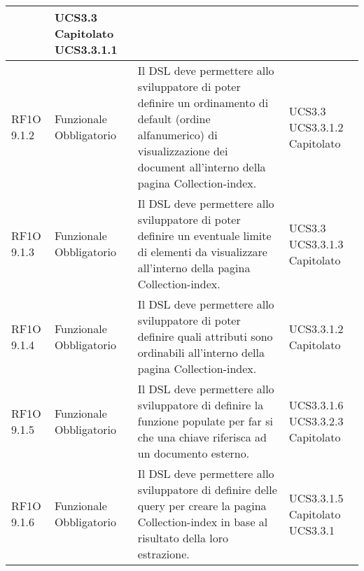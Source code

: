 \begin{center}
\begin{longtable}{ | l | p{2cm} | p{5cm} | p{1.7cm} |}
 &  UCS3.3 \newline  Capitolato \newline  UCS3.3.1.1 \newline  \\ \hline      
        RF1O 9.1.2  & Funzionale \newline  Obbligatorio  & Il DSL deve permettere allo sviluppatore di poter definire un ordinamento di default (ordine alfanumerico) di visualizzazione dei document all'interno della pagina Collection-index. &  UCS3.3 \newline  UCS3.3.1.2 \newline  Capitolato \newline  \\ \hline      
        RF1O 9.1.3  & Funzionale \newline  Obbligatorio  & Il DSL deve permettere allo sviluppatore di poter definire un eventuale limite di elementi da visualizzare all'interno della pagina Collection-index.
 &  UCS3.3 \newline  UCS3.3.1.3 \newline  Capitolato \newline  \\ \hline      
        RF1O 9.1.4  & Funzionale \newline  Obbligatorio  & Il DSL deve permettere allo sviluppatore di poter definire quali attributi sono ordinabili all'interno della pagina Collection-index.
 &  UCS3.3.1.2 \newline  Capitolato \newline  \\ \hline      
        RF1O 9.1.5 & Funzionale \newline  Obbligatorio  & Il DSL deve permettere allo sviluppatore di definire la funzione populate per far si che una chiave riferisca ad un documento esterno.
 &  UCS3.3.1.6 \newline  UCS3.3.2.3 \newline  Capitolato \newline  \\ \hline      
        RF1O 9.1.6 & Funzionale \newline  Obbligatorio  & Il DSL deve permettere allo sviluppatore di definire delle query per creare la pagina Collection-index in base al risultato della loro estrazione.
 &  UCS3.3.1.5 \newline  Capitolato \newline  UCS3.3.1 \newline  \\ \hline      

\end{longtable}
\end{center}
